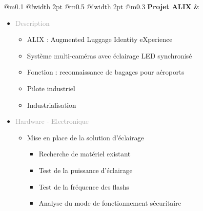 \documentclass{article}
\begin{document}
\begin{tabular}
    {
        @{}m{}
        @{\hspace{0.001\textwidth}}!{\color{secondaryBlue}\vline width 2pt} %
        @{}m{0.5\textwidth}
        @{\hspace{0.025\textwidth}}!{\color{secondaryBlue}\vline width 2pt} %
        @{{\hspace{0.001\textwidth}}}m{0.3\textwidth}
    }
    \textcolor{secondaryBlue}
    {
        \textbf{Projet ALIX}
    }           
    &
    \begin{itemize}
        [label={}, topsep=0pt, partopsep=0pt, itemsep=0.5pt, parsep=2pt]
        \setlength{\itemsep}{10pt} 
        \item \textcolor{darkGray}{Description}
        \begin{itemize}
        [label={\textcolor{gray!80}{\checkmark}}, topsep=10pt, partopsep=0pt, itemsep=0.5pt, parsep=2pt] 
            \item \textcolor{gray!80}{ALIX : Augmented Luggage Identity eXperience}
            \item \textcolor{gray!80}{Système multi-caméras avec éclairage LED synchronisé}
            \item \textcolor{gray!80}{Fonction : reconnaissance de bagages pour aéroports}
            \item \textcolor{gray!80}{Pilote industriel}
            \item \textcolor{gray!80}{Industrialisation}
        \end{itemize}
        \item \textcolor{darkGray}{Hardware - Electronique}
        \begin{itemize}
        [label={\textcolor{gray!80}{\checkmark}}, topsep=10pt, partopsep=0pt, itemsep=0.5pt, parsep=2pt] 
            \item \textcolor{gray!80}{Mise en place de la solution d'éclairage}
            \begin{itemize}
                [label={\textcolor{gray!80}{\checkmark}}, topsep=0pt, partopsep=0pt, itemsep=0.5pt, parsep=2pt] 
                \item \textcolor{gray!80}{Recherche de matériel existant}
                \item \textcolor{gray!80}{Test de la puissance d'éclairage}
                \item \textcolor{gray!80}{Test de la fréquence des flashs}
                \item \textcolor{gray!80}{Analyse du mode de fonctionnement sécuritaire}

\end{itemize}
\end{itemize}
\end{itemize}
\end{tabular}
\end{document}
